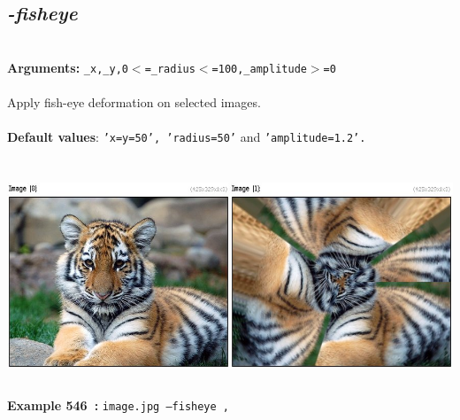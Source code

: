 \documentclass[a4paper,11pt,twoside]{book}
\begin{document}
\subsection{\emph{-fisheye} }\vspace*{-0.5em}
~\\\textbf{Arguments: } 
{\small \texttt{\_x,\_y,0$<$=\_radius$<$=100,\_amplitude$>$=0}}\\~\\
Apply fish-eye deformation on selected images.
~\\~\\\textbf{Default values}: {\small \texttt{'x=y=50', 'radius=50'} and \texttt{'amplitude=1.2'.}}
\begin{center}\includegraphics[keepaspectratio=true,height=7cm,width=\textwidth]{img/gmic_def546.jpg}\\
{\footnotesize \textbf{Example 546~:} \texttt{image.jpg --fisheye ,}}
\end{center}
\end{document}
